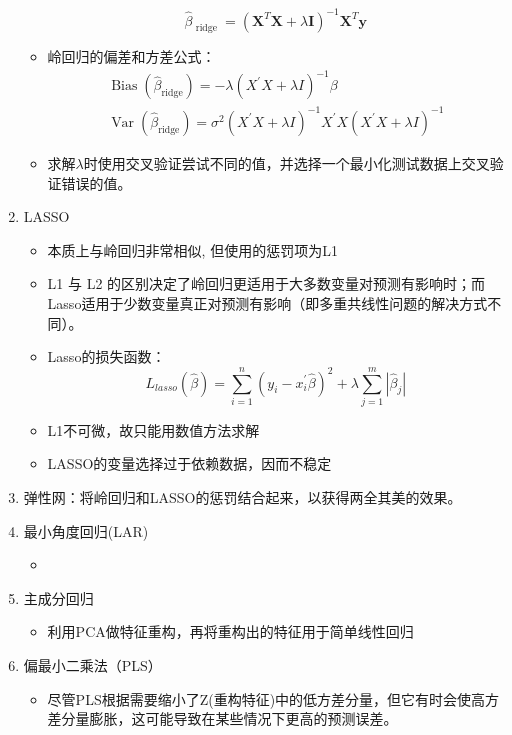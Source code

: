 \documentclass[UTF8]{article}%
\begin{document}
\begin{enumerate}
\begin{itemize}
				 		$$
				 		\hat{\beta}_{\text { ridge }}=\left(\mathbf{X}^{T} \mathbf{X}+\lambda \mathbf{I}\right)^{-1} \mathbf{X}^{T} \mathbf{y}
				 		$$
				 		\item 岭回归的偏差和方差公式：
				 		$$
				 		\begin{array}{c}{\operatorname{Bias}\left(\hat{\beta}_{\text {ridge}}\right)=-\lambda\left(X^{\prime} X+\lambda I\right)^{-1} \beta} \\ {\operatorname{Var}\left(\hat{\beta}_{\text {ridge}}\right)=\sigma^{2}\left(X^{\prime} X+\lambda I\right)^{-1} X^{\prime} X\left(X^{\prime} X+\lambda I\right)^{-1}}\end{array}
				 		$$
				 		\item 求解$\lambda$时使用交叉验证尝试不同的值，并选择一个最小化测试数据上交叉验证错误的值。
				 	\end{itemize}
		 		\item LASSO 
		 			\begin{itemize}
		 				\item 本质上与岭回归非常相似, 但使用的惩罚项为L1
		 				\item L1 与 L2 的区别决定了岭回归更适用于大多数变量对预测有影响时；而Lasso适用于少数变量真正对预测有影响（即多重共线性问题的解决方式不同）。
		 				\item Lasso的损失函数：
		 				$$
		 				L_{lasso}(\hat{\beta})=\sum_{i=1}^{n}\left(y_{i}-x_{i}^{\prime} \hat{\beta}\right)^{2}+\lambda \sum_{j=1}^{m}\left|\hat{\beta}_{j}\right|
		 				$$
		 				\item L1不可微，故只能用数值方法求解
		 				\item LASSO的变量选择过于依赖数据，因而不稳定
		 			\end{itemize}
	 			\item 弹性网：将岭回归和LASSO的惩罚结合起来，以获得两全其美的效果。
	 			\item 最小角度回归(LAR)
	 				\begin{itemize}
	 					\item 
	 				\end{itemize}
 				\item 主成分回归
 				\begin{itemize}
 					\item 利用PCA做特征重构，再将重构出的特征用于简单线性回归
 				\end{itemize}
 			\item 偏最小二乘法（PLS）
 			\begin{itemize}
 				\item 尽管PLS根据需要缩小了Z(重构特征)中的低方差分量，但它有时会使高方差分量膨胀，这可能导致在某些情况下更高的预测误差。
 			\end{itemize}
			\end{enumerate}
		
\end{document}

